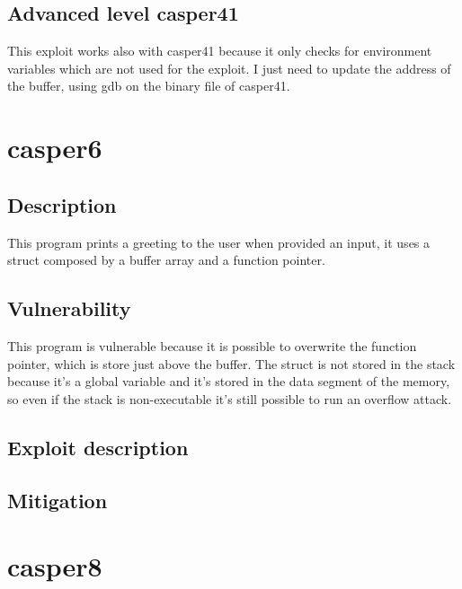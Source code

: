 \documentclass[a4paper,12pt]{article}
\begin{document}
\subsection{Advanced level casper41}

This exploit works also with casper41 because it only checks for environment variables which are not used for the exploit. I just need to update the address of the buffer, using gdb on the binary file of casper41.



\section{casper6}


\subsection{Description}

This program prints a greeting to the user when provided an input, it uses a struct composed by a buffer array and a function pointer.

\subsection{Vulnerability}

This program is vulnerable because it is possible to overwrite the function pointer, which is store just above the buffer.  The struct is not stored in the stack because it's a global variable and it's stored in the data segment of the memory, so even if the stack is non-executable it's still possible to run an overflow attack.


\subsection{Exploit description}




\subsection{Mitigation}



\section{casper8}
\end{document}
